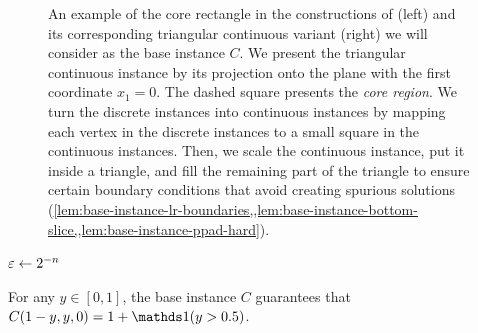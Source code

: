 \begin{figure}[t]
    \centering
    
    \caption{\small An example of the core rectangle in the constructions of \textcite{DBLP:journals/tcs/ChenD09} (left) and its corresponding triangular continuous variant (right) we will consider as the base instance $C$. 
    We present the triangular continuous instance by its projection onto the plane with the first coordinate $x_1=0$. 
    The dashed square presents the {\em core region}.     
    We turn the discrete instances into continuous instances by mapping each vertex in the discrete instances to a small square in the continuous instances. 
    Then, we scale the continuous instance, put it inside a triangle, and fill the remaining part of the triangle to ensure certain boundary conditions that avoid creating spurious solutions (\cref{lem:base-instance-lr-boundaries,,lem:base-instance-bottom-slice,,lem:base-instance-ppad-hard}). 
    }
    \label{fig:continuous-mapping}
\end{figure}

\begin{algorithm2e}[t]
    \caption{Base instance $C$}
    \label{alg:base-instance}

    \DontPrintSemicolon




    $\varepsilon\gets 2^{-n}$


      \label{line:default-coloring}
\end{algorithm2e}

    

\begin{fact} 
    \label{lem:base-instance-bottom-slice}
    For any $y\in [0,1]$, the base instance $C$ guarantees that $C(1-y,y,0)=1+\ind(y>0.5)$. 
\end{fact}

